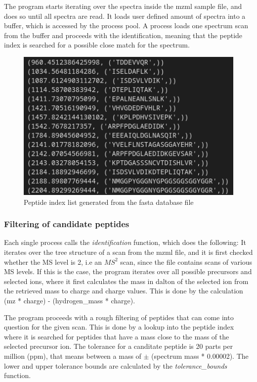 \documentclass[11pt]{article}
\begin{document}
The program starts iterating over the spectra inside the mzml sample file, and does so until all spectra are read. It loads user defined amount of spectra into a buffer, which is accessed by the process pool. A process loads one spectrum scan from the buffer and proceeds with the identification, meaning that the peptide index is searched for a possible close match for the spectrum.
\begin{figure}
\includegraphics[width=\linewidth]{figs/peptindex.png} 
\caption{Peptide index list generated from the fasta database file}
\label{fig:peptindex}
\end{figure}
\subsubsection{Filtering of candidate peptides}
Each single process calls the \textit{identification} function, which does the following:
It iterates over the tree structure of a scan from the mzml file, and it is first checked whether the MS level is 2, i.e an \(MS^2\) scan, since the file contains scans of various MS levels. If this is the case, the program iterates over all possible precursors and selected ions, where it first calculates the mass in dalton of the selected ion from the retrieved mass to charge and charge values. This is done by the calculation (mz * charge) - (hydrogen\_mass * charge).

The program proceeds with a rough filtering of peptides that can come into question for the given scan. This is done by a lookup into the peptide index where it is searched for peptides that have a mass close to the mass of the selected precursor ion. The tolerance for a canditate peptide is 20 parts per million (ppm), that means between a mass of $\pm$ (spectrum mass * 0.00002). The lower and upper tolerance bounds are calculated by the \textit{tolerance\_bounds} function. 
\end{document}
